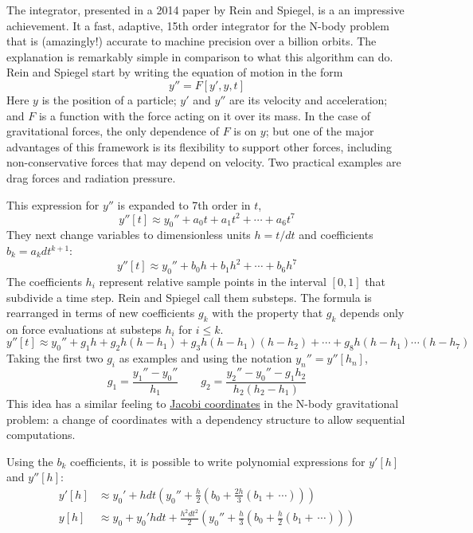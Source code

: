 The  integrator, presented in a 2014 paper by Rein and Spiegel, is a an impressive achievement.
It a fast, adaptive, 15th order integrator for the N-body problem that is (amazingly!) 
accurate to machine precision over a billion orbits.  
The explanation is remarkably simple in comparison to what this algorithm can do.  
Rein and Spiegel start by writing the equation of motion in the form 
$$y'' = F[y', y, t]$$
Here $y$ is the position of a particle; $y'$ and $y''$ are its velocity and acceleration;
and $F$ is a function with the force acting on it over its mass.
In the case of gravitational forces, the only dependence of $F$ is on $y$; 
but one of the major advantages of this framework is its flexibility to support other forces,
including non-conservative forces that may depend on velocity.
Two practical examples are drag forces and radiation pressure.

This expression for $y''$ is expanded to 7th order in $t$, 
$$y''[t] \approx y_0'' + a_0t + a_1t^2 + \cdots +a_6 t^7$$
They next change variables to dimensionless units $h = t / dt$ and coefficients $b_k = a_k dt^{k+1}$:
$$y''[t] \approx y_0'' + b_0h + b_1h^2 + \cdots + b_6 h^7$$
The coefficients $h_i$ represent relative sample points in the interval $[0, 1]$ that subdivide a time step.
Rein and Spiegel call them substeps.  
The formula is rearranged in terms of new coefficients $g_k$ with the property that $g_k$ depends
only on force evaluations at substeps $h_i$ for $i \le k$.
$$y''[t] \approx y_0'' + g_1h + g_2h(h-h_1) + g_3h(h-h_1)(h-h_2) + \cdots + g_8 h (h-h_1) \cdots (h-h_7)$$
Taking the first two $g_i$ as examples and using the notation $y_n'' = y''[h_n]$,
$$g_1 = \frac{y_1'' - y_0''}{h_1} \quad\quad  g_2 = \frac{y_2'' - y_0'' -g_1h_2}{h_2(h_2-h_1)}$$
This idea has a similar feeling to \href{https://en.wikipedia.org/wiki/Jacobi_coordinates}{Jacobi coordinates}
in the N-body gravitational problem: a change of coordinates with a dependency structure to allow sequential computations.

Using the $b_k$ coefficients, it is possible to write polynomial expressions for $y'[h]$ and $y''[h]$:
\begin{align*}
y'[h] &\approx y_0' + h dt \left(y_0'' + \frac{h}{2}\left(b_0 + \frac{2h}{3}\left(b_1 + \frac{}{} \cdots \right)\right) \right) \\
y[h] &\approx y_0 + y_0' h dt + \frac{h^2dt^2}{2}\left(y_0'' + \frac{h}{3}\left(b_0 + \frac{h}{2}\left(b_1 + \frac{}{} \cdots \right)\right) \right)
\end{align*}

